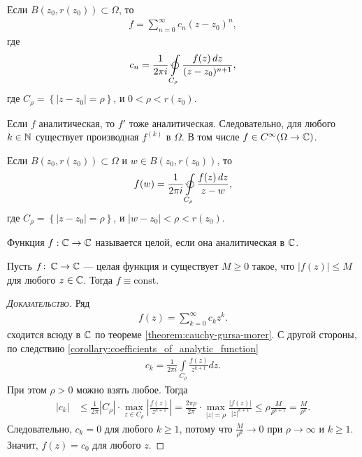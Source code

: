 \documentclass[../complex-analysis.tex]{subfiles}
\begin{document}
\begin{crly}
	\label{corollary:coefficients_of_analytic_function}
 Если $ B(z_0, r(z_0)) \subset \Omega $, то
 \begin{align*}
  f = \sum_{n=0}^{\infty}c_n(z-z_0)^{n},
 \end{align*} где
 \begin{align*}
  c_n = \frac{1}{2\pi i} \varointctrclockwise\limits_{C_\rho} \frac{f(z)\,dz}{(z-z_0)^{n+1}},
 \end{align*} где $ C_\rho = \left\{ \left| z-z_0 \right| = \rho \right\} $, и $ 0 < \rho < r(z_0) $.
\end{crly}
\begin{crly}
 Если $ f $ аналитическая, то $ f' $ тоже аналитическая. Следовательно, для любого $ k \in \mathbb{N} $ существует производная $ f^{(k)} $ в $ \Omega $. В том числе $ f \in C^{\infty}(\Omega \to \mathbb{C}) $.
\end{crly}
\begin{crly}
 Если $ B(z_0, r(z_0)) \subset \Omega $ и $ w \in B(z_0,r(z_0)) $, то
 \begin{align*}
  f(w) = \frac{1}{2\pi i} \varointctrclockwise\limits_{C_\rho} \frac{f(z)\,dz}{z - w},
 \end{align*} где $ C_\rho = \left\{ \left| z-z_0 \right| = \rho \right\} $, и $ \left| w - z_0 \right| < \rho < r(z_0) $.
\end{crly}

\begin{df}
	Функция $f: \mathbb{C} \to \mathbb{C}$ называется целой, если она аналитическая в $\mathbb{C}$.
\end{df}
\begin{thm}[Лиувилля]
 \label{theorem:liuvill}
 Пусть $ f \colon\, \mathbb{C} \to \mathbb{C} $ --- целая функция и существует $ M \geq 0 $ такое, что $ \left| f(z) \right| \leqslant M $ для любого $ z \in \mathbb{C} $. Тогда $ f \equiv \mathrm{const} $.
\end{thm}
\begin{proof}[\normalfont\textsc{Доказательство}]
 Ряд
 \begin{align*}
  f(z) = \sum_{k=0}^{\infty} c_k z^{k}.
\end{align*} сходится всюду в $ \mathbb{C} $ по теореме \ref{theorem:cauchy-gursa-morer}. С другой стороны, по следствию \ref{corollary:coefficients_of_analytic_function}
 \begin{align*}
  c_k = \frac{1}{2\pi i} \int\limits_{C_\rho} \frac{f(z)}{z^{k+1}} dz.
 \end{align*} При этом $ \rho > 0 $ можно взять любое. Тогда
 \begin{align*}
  \left| c_k \right| &\leqslant \frac{1}{2\pi} \left| C_\rho \right| \cdot \max_{z \in C_\rho} \left| \frac{f(z)}{z^{k+1}} \right| = \frac{2\pi \rho}{2\pi}  \cdot \max_{\left| z \right|=\rho} \frac{\left| f(z) \right|}{\left| z \right|^{k+1}} \leqslant \rho \frac{M}{\rho^{k+1}} = \frac{M}{\rho^{k}}.
 \end{align*} Следовательно, $ c_k = 0 $ для любого $ k \geqslant 1 $, потому что $ \frac{M}{\rho^{k}} \to 0 $ при $ \rho \to \infty $ и $ k \geqslant 1 $. Значит, $ f(z) = c_0 $ для любого $ z $.
\end{proof}
\end{document}
